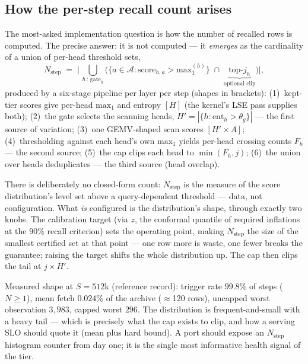 \documentclass[11pt]{article}
\begin{document}
\subsection{How the per-step recall count arises}\label{sec:count}
The most-asked implementation question is how the number of recalled rows
is computed. The precise answer: it is not computed --- it \emph{emerges}
as the cardinality of a union of per-head threshold sets,
\[
N_{\mathrm{step}} \;=\; \Big|\, \bigcup_{h\,:\,\mathrm{gate}_h}
\big(\{a \in \mathcal{A} : \mathrm{score}_{h,a} > \mathrm{max}_1^{(h)}\}
\;\cap\; \underbrace{\mathrm{top}\text{-}j_h}_{\text{optional clip}}\big) \Big| ,
\]
produced by a six-stage pipeline per layer per step (shapes in brackets):
(1)~kept-tier scores give per-head $\mathrm{max}_1$ and entropy $[H]$ (the
kernel's LSE pass supplies both); (2)~the gate selects the scanning heads,
$H' = |\{h : \mathrm{ent}_h > \theta_g\}|$ --- the first source of
variation; (3)~one GEMV-shaped scan scores $[H' \times A]$;
(4)~thresholding against each head's own $\mathrm{max}_1$ yields per-head
crossing counts $F_h$ --- the second source; (5)~the cap clips each head to
$\min(F_h, j)$; (6)~the union over heads deduplicates --- the third source
(head overlap).

There is deliberately no closed-form count: $N_{\mathrm{step}}$ is the
measure of the score distribution's level set above a query-dependent
threshold --- data, not configuration. What \emph{is} configured is the
distribution's shape, through exactly two knobs. The calibration target
(via $z$, the conformal quantile of required inflations at the 90\%
recall criterion) sets the operating point, making $N_{\mathrm{step}}$ the
size of the smallest certified set at that point --- one row more is
waste, one fewer breaks the guarantee; raising the target shifts the whole
distribution up. The cap then clips the tail at $j \times H'$.

Measured shape at $S{=}512$k (reference record): trigger rate $99.8\%$ of
steps ($N \ge 1$), mean fetch $0.024\%$ of the archive ($\approx$120 rows),
uncapped worst observation $3{,}983$, capped worst $296$. The distribution
is frequent-and-small with a heavy tail --- which is precisely what the cap
exists to clip, and how a serving SLO should quote it (mean plus hard
bound). A port should expose an $N_{\mathrm{step}}$ histogram counter from
day one; it is the single most informative health signal of the tier.
\end{document}
